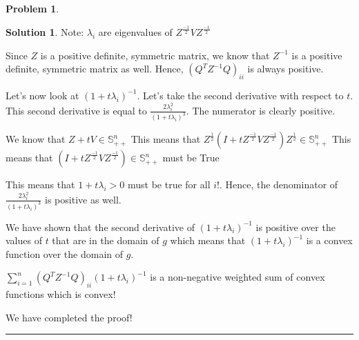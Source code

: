\documentclass{article}
\theoremstyle{definition}
\newtheorem{problem}{Problem}
\def\fline{\rule{0.75\linewidth}{0.5pt}}
\newcommand{\finishline}{\begin{center}\fline\end{center}}
\newtheorem*{solution*}{Solution}
\newenvironment{solution}{\begin{solution*}}{{\finishline} \end{solution*}}
\begin{document}
\begin{problem}
\begin{itemize}
\begin{solution}
            Note: $\lambda_i$ are eigenvalues of $Z^{\frac{-1}{2}} V Z^{\frac{-1}{2}}$ 

            Since $Z$ is a positive definite, symmetric matrix, we know that $Z^{-1}$ is a positive definite, symmetric matrix as well. Hence, $(Q^TZ^{-1} Q)_{ii}$ is always positive. \newline 

            Let's now look at $(1 + t\lambda_i)^{-1}$. Let's take the second derivative with respect to $t$. This second derivative is equal to $\frac{2\lambda_i^2}{(1 + t\lambda_i)^3}$. The numerator is clearly positive. \newline 

            We know that $Z + tV \in \mathbb{S}^n_{++}$ \newline 
            This means that $Z^{\frac{1}{2}} (I + tZ^{\frac{-1}{2}} V Z^{\frac{-1}{2}}) Z^{\frac{1}{2}} \in \mathbb{S}^n_{++}$ \newline 
            This means that $(I + tZ^{\frac{-1}{2}} V Z^{\frac{-1}{2}}) \in \mathbb{S}^n_{++}$ must be True

            This means that $1 + t\lambda_i > 0$ must be true for all $i$!. Hence, the denominator of $\frac{2\lambda_i^2}{(1 + t\lambda_i)^3}$ is positive as well. 

            We have shown that the second derivative of $(1 + t\lambda_i)^{-1}$ is positive over the values of $t$ that are in the domain of $g$ which means that $(1 + t\lambda_i)^{-1}$ is a convex function over the domain of $g$.

            $\sum_{i=1}^{n} (Q^TZ^{-1} Q)_{ii} (1 + t\lambda_i)^{-1}$ is a non-negative weighted sum of convex functions which is convex!

            We have completed the proof!

        \end{solution}  
    \end{itemize}
\end{problem}
\end{document}
